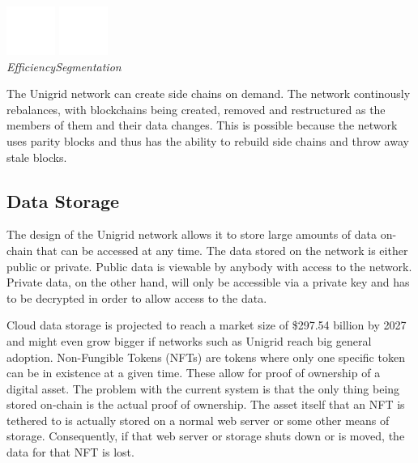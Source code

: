 \documentclass[a4paper,oneside]{article}
\begin{document}
\begin{center}
\vspace{0.1cm}
\includegraphics[width=45pt]{efficiency}
\hspace{1.5cm}
\includegraphics[width=45pt]{segmented}
\\
\vspace{0.1cm}
\hspace{10pt}\emph{Efficiency}\hspace{46pt}\emph{Segmentation}
\end{center}

\noindent The Unigrid network can create side chains on demand. The network continously rebalances, with blockchains being created, removed and restructured as the members of them and their data changes. This is possible because the network uses parity blocks and thus has the ability to rebuild side chains and throw away stale blocks.

\subsection{Data Storage}
The design of the Unigrid network allows it to store large amounts of data on-chain that can be accessed at any time. The data stored on the network is either public or private. Public data is viewable by anybody with access to the network. Private data, on the other hand, will only be accessible via a private key and has to be decrypted in order to allow access to the data.

\noindent Cloud data storage is projected to reach a market size of \$297.54 billion by 2027 \cite{fort2021} and might even grow bigger if networks such as Unigrid reach big general adoption. Non-Fungible Tokens (NFTs) are tokens where only one specific token can be in existence at a given time. These allow for proof of ownership of a digital asset. The problem with the current system is that the only thing being stored on-chain is the actual proof of ownership. The asset itself that an NFT is tethered to is actually stored on a normal web server or some other means of storage. Consequently, if that web server or storage shuts down or is moved, the data for that NFT is lost.
\end{document}
